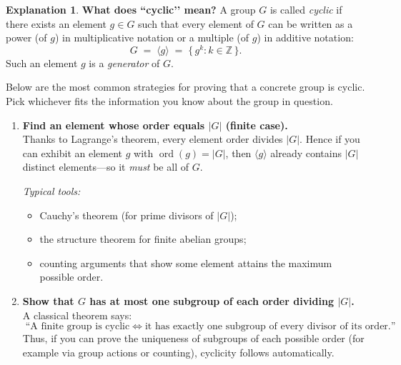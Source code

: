 \documentclass[12pt]{article}
\theoremstyle{definition} %
\newtheorem{explanation}{Explanation}
\theoremstyle{plain} %
\begin{document}
  \begin{explanation}
    \textbf{What does “cyclic’’ mean?}  
    A group \(G\) is called \emph{cyclic} if there exists an element
    \(g\in G\) such that every element of \(G\) can be written as a power
    (of \(g\)) in multiplicative notation or a multiple (of \(g\)) in
    additive notation:
    \[
       G \;=\; \langle g\rangle
         \;=\;\{\,g^{k} : k\in\mathbb{Z}\,\}.
    \]
    Such an element \(g\) is a \emph{generator} of \(G\).
    
    \medskip
    Below are the most common strategies for proving that a concrete group
    is cyclic.  Pick whichever fits the information you know about the
    group in question.
    
    \begin{enumerate}[label=\textbf{(\arabic*)},leftmargin=2.2em]
    
      \item \textbf{Find an element whose order equals
            \(\lvert G\rvert\) (finite case).}\\
            Thanks to Lagrange’s theorem, every element order divides
            \(\lvert G\rvert\).  
            Hence if you can exhibit an element \(g\) with
            \(\operatorname{ord}(g)=\lvert G\rvert\), then
            \(\langle g\rangle\) already contains \(\lvert G\rvert\)
            distinct elements—so it \emph{must} be all of \(G\).
    
            \smallskip
            \textit{Typical tools:}
            \begin{itemize}
              \item Cauchy’s theorem (for prime divisors of \(\lvert G\rvert\));
              \item the structure theorem for finite abelian groups;
              \item counting arguments that show some element attains the
                    maximum possible order.
            \end{itemize}
    
      \item \textbf{Show that \(G\) has at most one subgroup of each order
            dividing \(\lvert G\rvert\).}\\
            A classical theorem says:
            \[
               \text{“A finite group is cyclic}
               \;\Longleftrightarrow\;
               \text{it has exactly one subgroup of every divisor of
               its order.”}
            \]
            Thus, if you can prove the uniqueness of subgroups of each
            possible order (for example via group actions or counting),
            cyclicity follows automatically.
    

\end{enumerate}
\end{explanation}
\end{document}
